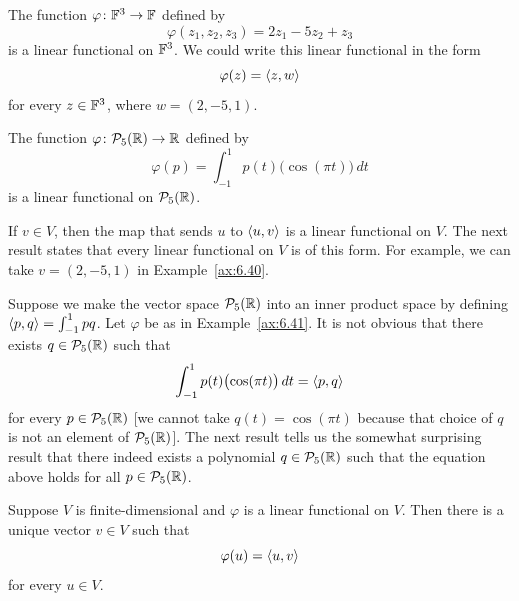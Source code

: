 \begin{example}\label{ax:6.40}
The function $\varphi\colon\mathbb{F}^3\to\mathbb{F}$ defined by
\[ \varphi(z_1,z_2,z_3) = 2z_1-5z_2+z_3 \]
is a linear functional on $\mathbb{F}^3$. We could write this linear functional in the
form
\[ \varphi(z) = \langle z, w \rangle \]
for every $z\in\mathbb{F}^3$, where $w=(2,-5,1)$.
\end{example}

\begin{example}\label{ax:6.41}
The function $\varphi\colon\mathcal{P}_5(\mathbb{R})\to\mathbb{R}$ defined by
\[ \varphi(p) = \int_{-1}^{1} p(t)\bigl(\cos(\pi t)\bigr)\,dt \]
is a linear functional on $\mathcal{P}_5(\mathbb{R})$.
\end{example}

%
If $v\in V$, then the map that sends $u$ to $\langle u, v \rangle$ is a linear functional
on $V$. The next result states that every linear functional on $V$ is of this
form. For example, we can take $v=(2,-5,1)$ in Example~\ref{ax:6.40}.

Suppose we make the vector space $\mathcal{P}_5(\mathbb{R})$ into an inner product space by
defining $\langle p, q \rangle=\int_{-1}^{1}pq$. Let $\varphi$ be as in
Example~\ref{ax:6.41}. It is not obvious that there exists $q\in\mathcal{P}_5(\mathbb{R})$
such that
\[ \int_{-1}^{1} p(t)\bigl(\cos(\pi t)\bigr)\,dt = \langle p, q \rangle \]
for every $p\in\mathcal{P}_5(\mathbb{R})$ [we cannot take $q(t)=\cos(\pi t)$ because that
choice of $q$ is not an element of $\mathcal{P}_5(\mathbb{R})$]. The next result tells us the
somewhat surprising result that there indeed exists a polynomial
$q\in\mathcal{P}_5(\mathbb{R})$ such that the equation above holds for all $p\in\mathcal{P}_5(\mathbb{R})$.

\begin{result}\label{ax:6.42}
Suppose $V$ is finite-dimensional and $\varphi$ is a linear functional on $V$.
Then there is a unique vector $v\in V$ such that
\[ \varphi(u) = \langle u, v \rangle \]
for every $u\in V$.
\end{result}

